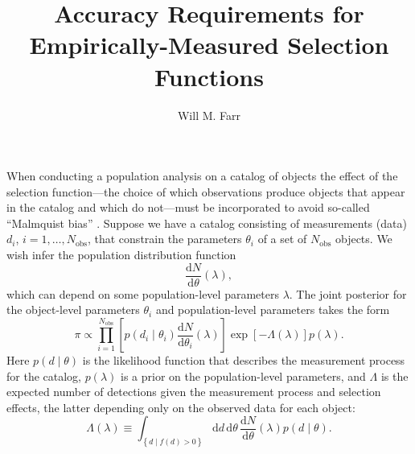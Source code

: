 \documentclass[modern]{aastex62}
\newcommand{\dd}{\mathrm{d}}
\newcommand{\diff}[2]{\frac{\dd #1}{\dd #2}}
\newcommand{\Nobs}{N_\mathrm{obs}}
\begin{document}
\title{Accuracy Requirements for Empirically-Measured Selection Functions}

\author[0000-0003-1540-8562]{Will M. Farr}

\maketitle

When conducting a population analysis on a catalog of objects the effect of the
selection function---the choice of which observations produce objects that
appear in the catalog and which do not---must be incorporated to avoid so-called
``Malmquist bias'' \citep{Malmquist1922,Loredo2004,Mandel2018}. Suppose we have
a catalog consisting of measurements (data) $d_i$, $i = 1, \ldots, \Nobs$, that
constrain the parameters $\theta_i$ of a set of $\Nobs$ objects.  We wish infer
the population distribution function
%
\begin{equation}
  \diff{N}{\theta}\left( \lambda \right),
\end{equation}
%
which can depend on some population-level parameters $\lambda$.  The joint
posterior for the object-level parameters $\theta_i$ and population-level
parameters takes the form \citep{Loredo2004,Mandel2018}
%
\begin{equation}
  \label{eq:posterior}
\pi \propto \prod_{i=1}^{\Nobs} \left[ p\left( d_i \mid \theta_i \right) \diff{N}{\theta_i}\left( \lambda \right) \right] \exp\left[ - \Lambda\left( \lambda \right) \right] p\left( \lambda \right).
\end{equation}
%
Here $p\left( d \mid \theta\right)$ is the likelihood function that describes
the measurement process for the catalog, $p\left( \lambda \right)$ is a prior on
the population-level parameters, and $\Lambda$ is the expected number of
detections given the measurement process and selection effects, the latter
depending only on the observed data for each object:
%
\begin{equation}
  \label{eq:selection-integral-unnorm}
  \Lambda\left( \lambda \right) \equiv \int_{\left\{ d \mid f(d) > 0 \right\}} \dd d \, \dd \theta \, \diff{N}{\theta}\left( \lambda \right) p\left( d \mid \theta \right).
\end{equation}
\end{document}
